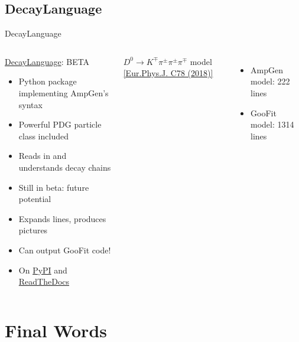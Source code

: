 \documentclass[aspectratio=169, smaller]{beamer}
\begin{document}
\subsection{DecayLanguage}
\begin{frame}{DecayLanguage}
    \begin{columns}[c]
        \begin{block}{\href{https://decaylanguage.readthedocs.io/en/latest/}{DecayLanguage}: BETA}
            \begin{itemize}
                \item Python package implementing AmpGen's syntax
                \item Powerful PDG particle class included
                \item Reads in and understands decay chains
                \item Still in beta: future potential
                \item Expands lines, produces pictures
                \item Can output GooFit code!
                \item On \href{https://pypi.org/project/decaylanguage/}{PyPI} and \href{https://decaylanguage.readthedocs.io/en/latest/}{ReadTheDocs}
            \end{itemize}
        \end{block}
        $D^0\rightarrow K^{\mp} \pi^{\pm} \pi^{\pm} \pi^{\mp}$ model \href{https://inspirehep.net/record/1644791}{[Eur.Phys.J. C78 (2018)]}
        
        \begin{itemize}
            \item AmpGen model: 222 lines
            \item GooFit model: 1314 lines
        \end{itemize}
    \end{columns}
\end{frame}

\section{Final Words}
\end{document}
